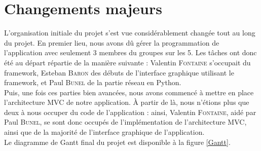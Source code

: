 \documentclass[twoside]{report}
\begin{document}
\section{Changements majeurs}
L'organisation initiale du projet s'est vue considérablement changée tout au long du projet. En premier lieu, nous avons dû gérer la programmation de l'application avec seulement 3 membres du groupes sur les 5. Les tâches ont donc été au départ répartie de la manière suivante : Valentin \textsc{Fontaine} s'occupait du framework, Esteban \textsc{Baron} des débuts de l'interface graphique utilisant le framework, et Paul \textsc{Bunel} de la partie réseau en Python. \\
Puis, une fois ces parties bien avancées, nous avons commencé à mettre en place l'architecture MVC de notre application. À partir de là, nous n'étions plus que deux à nous occuper du code de l'application : ainsi, Valentin \textsc{Fontaine}, aidé par Paul \textsc{Bunel}, se sont donc occupés de l'implémentation de l'architecture MVC, ainsi que de la majorité de l'interface graphique de l'application. \\
Le diagramme de Gantt final du projet est disponible à la figure \ref{Gantt}.

\newpage
\thispagestyle{empty}
\end{document}
